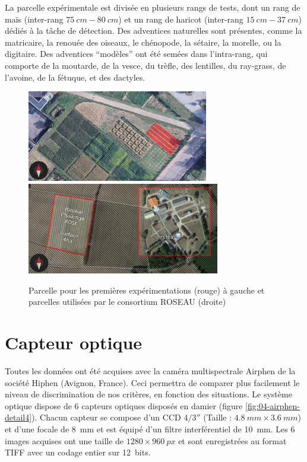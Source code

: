 \documentclass[../thesis.tex]{subfiles}
\begin{document}
    La parcelle expérimentale est divisée en plusieurs rangs de tests, dont un rang de maïs (inter-rang $\SI{75}{cm} - \SI{80}{cm}$) et un rang de haricot (inter-rang $\SI{15}{cm} - \SI{37}{cm}$) dédiés à la tâche de détection. Des adventices naturelles sont présentes, comme la matricaire, la renouée des oiseaux, le chénopode, la sétaire, la morelle, ou la digitaire. Des adventices ``modèles'' ont été semées dans l'intra-rang, qui comporte de la moutarde, de la vesce, du trèfle, des lentilles, du ray-grass, de l'avoine, de la fétuque, et des dactyles.
    
    \vfill
    \begin{figure}[H]
        \centering
        \includegraphics[height=4cm]{img/material/parcelle-inra}
        \includegraphics[height=4cm]{img/material/parcelle-xp}
        \caption{Parcelle pour les premières expérimentations (rouge) à gauche et parcelles utilisées par le consortium ROSEAU (droite)}
        \label{fig:04-parcelle-inra}
    \end{figure}
    \vfill
    \null
    
    
    \newpage
    \section{Capteur optique}
    
    \par Toutes les données ont été acquises avec la caméra multispectrale  Airphen de la société Hiphen (Avignon, France). Ceci permettra de comparer plus facilement le niveau de discrimination de nos critères, en fonction des situations. Le système optique dispose de 6 capteurs optiques disposés en damier (figure \ref{fig:04-airphen-detail4}). Chacun capteur se compose d'un CCD $4/3''$ (Taille : $\SI{4.8}{mm} \times \SI{3.6}{mm}$) et d'une focale de \SI{8}{mm} et est équipé d'un filtre interférentiel de \SI{10}{mm}. Les 6 images acquises ont une taille de $1280\times\SI{960}{px}$ et sont enregistrées au format TIFF avec un codage entier sur \SI{12}{bits}.
    
\end{document}
